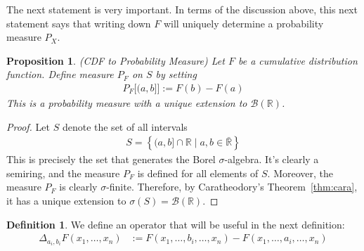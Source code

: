 \documentclass[12pt]{article}
\theoremstyle{plain}
\newtheorem{prop}[thm]{Proposition}
\newtheorem{cor}[thm]{Corollary}
\theoremstyle{definition}
\newtheorem{defn}[thm]{Definition}
\theoremstyle{remark}
\newcommand{\sB}{\mathscr{B}}
\newcommand{\R}{\mathbb{R}}
\begin{document}

The next statement is very important. In terms of the discussion above,
this next statement says that writing down $F$ will uniquely determine a
probability measure $P_X$.


\begin{prop}\emph{(CDF to Probability Measure)}
Let $F$ be a cumulative distribution function. Define
measure $P_F$ on $S$ by setting
\begin{align*}
  P_F\big[(a,b]\big] := F(b)-F(a)
\end{align*}
This is a probability measure with a unique extension to $\sB(\R)$.
\end{prop}
\begin{proof}
Let $S$ denote the set of all intervals
\begin{align*}
  S = \left\{ (a,b] \cap \R \;|\; a,b\in\bar{\R}\right\}
\end{align*}
This is precisely the set that generates the Borel $\sigma$-algebra.
It's clearly a semiring, and the measure $P_F$ is defined for all
elements of $S$.
Moreover, the measure $P_F$ is clearly $\sigma$-finite. Therefore,
by Caratheodory's Theorem~\ref{thm:cara}, it has a unique extension to
$\sigma(S)=\sB(\R)$.
\end{proof}


\begin{defn}
We define an operator that will be useful in the next definition:
\begin{align*}
  \Delta_{a_i,b_i} F(x_1,\ldots,x_n)
  &:= F(x_1,\ldots,b_i,\ldots,x_n)
  - F(x_1,\ldots,a_i,\ldots,x_n)
\end{align*}
\end{defn}
\end{document}
